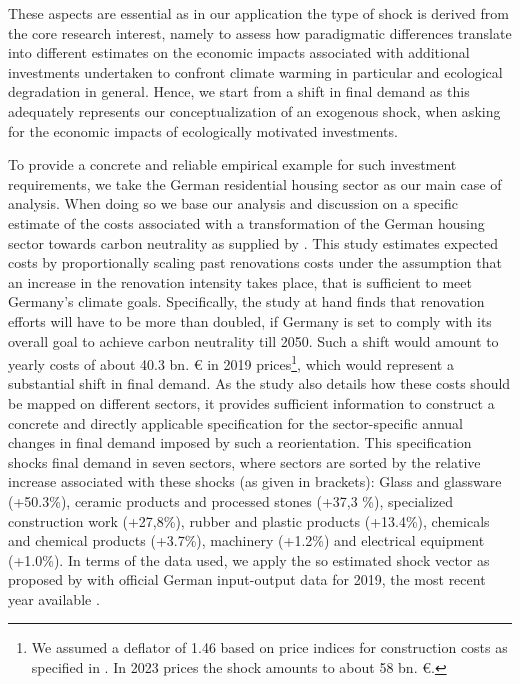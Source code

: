 These aspects are essential as in our application the type of shock is derived from the core research interest, namely to assess how paradigmatic differences translate into different estimates on the economic impacts associated with additional investments undertaken to confront climate warming in particular and ecological degradation in general. Hence, we start from a shift in final demand as this adequately represents our conceptualization of an exogenous shock, when asking for the economic impacts of ecologically motivated investments.

To provide a concrete and reliable empirical example for such investment requirements, we take the German residential housing sector as our main case of analysis. When doing so we base our analysis and discussion on a specific estimate of the costs associated with a transformation of the German housing sector towards carbon neutrality as supplied by \citet{Hornykewycz.2025}. This study estimates expected costs by proportionally scaling past renovations costs under the assumption that an increase in the renovation intensity takes place, that is sufficient to meet Germany's climate goals. Specifically, the study at hand finds that renovation efforts will have to be more than doubled, if Germany is set to comply with its overall goal to achieve carbon neutrality till 2050. Such a shift would amount to yearly costs of about 40.3 bn. € in 2019 prices\footnote{We assumed a deflator of 1.46 based on price indices for construction costs as specified in \citet{Hornykewycz.2025}. In 2023 prices the shock amounts to about 58 bn. €.}, which would represent a substantial shift in final demand. As the study also details how these costs should be mapped on different sectors, it provides sufficient information to construct a concrete and directly applicable specification for the sector-specific annual changes in final demand imposed by such a reorientation. This specification shocks final demand in seven sectors, where sectors are sorted by the relative increase associated with these shocks (as given in brackets): 
Glass and glassware (+50.3\%), ceramic products and processed stones (+37,3 \%), specialized construction work (+27,8\%), rubber and plastic products (+13.4\%), chemicals and chemical products (+3.7\%), machinery (+1.2\%) and electrical equipment (+1.0\%).
In terms of the data used, we apply the so estimated shock vector as proposed by \citet{Hornykewycz.2025} with official German input-output data for 2019, the most recent year available \citep[see][]{destatis_strukturdaten}.

